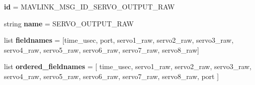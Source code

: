 \begin{DoxyCompactItemize}
\item 
\mbox{\label{classpymavlink_1_1dialects_1_1v10_1_1MAVLink__servo__output__raw__message_a5ac93d656babe65963f371c909ef1ef5}} 
{\bfseries id} = M\+A\+V\+L\+I\+N\+K\+\_\+\+M\+S\+G\+\_\+\+I\+D\+\_\+\+S\+E\+R\+V\+O\+\_\+\+O\+U\+T\+P\+U\+T\+\_\+\+R\+AW
\item 
\mbox{\label{classpymavlink_1_1dialects_1_1v10_1_1MAVLink__servo__output__raw__message_a0404eed796afb17aad394f26fd456775}} 
string {\bfseries name} = \textquotesingle{}S\+E\+R\+V\+O\+\_\+\+O\+U\+T\+P\+U\+T\+\_\+\+R\+AW\textquotesingle{}
\item 
\mbox{\label{classpymavlink_1_1dialects_1_1v10_1_1MAVLink__servo__output__raw__message_a74421fe66d5101811fb6b1c62e111dac}} 
list {\bfseries fieldnames} = \mbox{[}\textquotesingle{}time\+\_\+usec\textquotesingle{}, \textquotesingle{}port\textquotesingle{}, \textquotesingle{}servo1\+\_\+raw\textquotesingle{}, \textquotesingle{}servo2\+\_\+raw\textquotesingle{}, \textquotesingle{}servo3\+\_\+raw\textquotesingle{}, \textquotesingle{}servo4\+\_\+raw\textquotesingle{}, \textquotesingle{}servo5\+\_\+raw\textquotesingle{}, \textquotesingle{}servo6\+\_\+raw\textquotesingle{}, \textquotesingle{}servo7\+\_\+raw\textquotesingle{}, \textquotesingle{}servo8\+\_\+raw\textquotesingle{}\mbox{]}
\item 
\mbox{\label{classpymavlink_1_1dialects_1_1v10_1_1MAVLink__servo__output__raw__message_a74c58634c9d90a35f1d5af7ac4b70a56}} 
list {\bfseries ordered\+\_\+fieldnames} = \mbox{[} \textquotesingle{}time\+\_\+usec\textquotesingle{}, \textquotesingle{}servo1\+\_\+raw\textquotesingle{}, \textquotesingle{}servo2\+\_\+raw\textquotesingle{}, \textquotesingle{}servo3\+\_\+raw\textquotesingle{}, \textquotesingle{}servo4\+\_\+raw\textquotesingle{}, \textquotesingle{}servo5\+\_\+raw\textquotesingle{}, \textquotesingle{}servo6\+\_\+raw\textquotesingle{}, \textquotesingle{}servo7\+\_\+raw\textquotesingle{}, \textquotesingle{}servo8\+\_\+raw\textquotesingle{}, \textquotesingle{}port\textquotesingle{} \mbox{]}

\end{DoxyCompactItemize}
